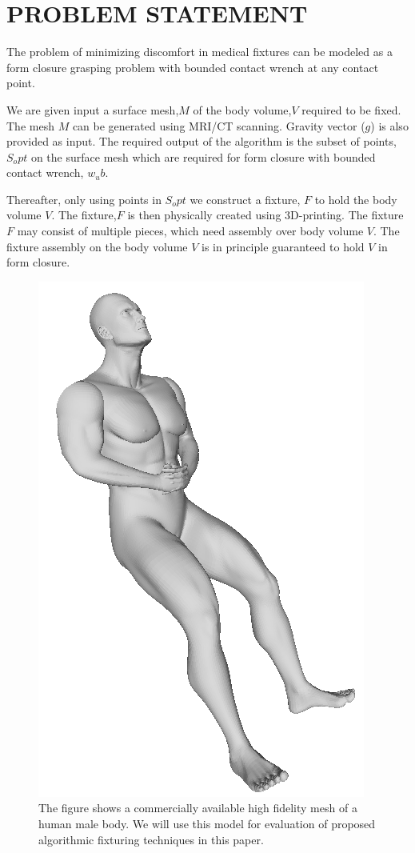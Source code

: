 
\section{PROBLEM STATEMENT}
\label{sec:problemStatement}

The problem of minimizing discomfort in medical fixtures can be modeled as a 
form closure grasping problem with bounded contact wrench at any contact point.

We are given input a surface mesh,$M$ of the body volume,$V$ required to be 
fixed. The mesh $M$ can be generated using MRI/CT scanning. Gravity vector ($g$) is also provided as input. The required output
 of the algorithm is the subset of points, $S_opt$ on the surface mesh which 
 are required for form closure with bounded contact wrench, $w_ub$. 

Thereafter, only using points in $S_opt$ we construct a fixture, $F$ to hold the 
body volume $V$. The fixture,$F$ is then physically created using 3D-printing. 
The fixture $F$ may consist of multiple pieces, which need assembly over body 
volume $V$. The fixture assembly on the body volume $V$ is in principle 
guaranteed to hold $V$ in form closure. 

\begin{figure}[t!]
  \begin{center}
    \includegraphics[width=0.6\linewidth]{images/maleBody}
  \end{center}
  \vspace{-10pt}
\caption{ The figure shows a commercially available high fidelity mesh of a human male body. We will use this model for evaluation of proposed algorithmic fixturing techniques in this paper.}
  \vspace*{-15pt}
  \label{fig:maleBody}
\end{figure}


